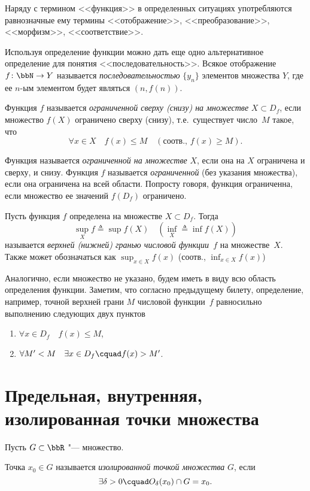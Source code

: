 Наряду с термином <<функция>> в определенных ситуациях употребляются равнозначные ему термины <<отображение>>, <<преобразование>>, <<морфизм>>, <<соответствие>>.
\begin{notion}
Используя определение функции можно дать еще одно альтернативное определение для понятия <<последовательность>>. Всякое отображение $f\colon \bbN \to Y$  называется \textit{последовательностью} $\{y_n\}$ элементов множества $Y$, где ее $n$-ым элементом будет являться $(n, f(n))$.
\end{notion} 

\begin{defn}
Функция $f$ называется \textit{ограниченной сверху (снизу) на множестве} $X\subset D_f$, если множество $f(X)$ ограничено сверху (снизу), т.е.~существует число~$M$ такое, что
$$
\forall x \in X \quad f(x) \le M \quad (\text{соотв., }f(x)\ge M).
$$
\end{defn}

Функция называется \textit{ограниченной на множестве} $X$, если она на $X$ ограничена и сверху, и снизу. Функция $f$ называется \textit{ограниченной} (без указания множества), если она ограничена на всей области. Попросту говоря, функция ограниченна, если множество ее значений $f(D_f)$ ограничено.

\begin{defn}
Пусть функция $f$ определена на множестве $X\subset D_f$. Тогда 
$$
\sup_{X}\limits f \triangleq \sup f(X)\quad (\inf_{X}\limits \triangleq \inf f(X))
$$ называется \textit{верхней (нижней) гранью числовой функции~$f$} на множестве~$X$. Также может обозначаться как $\sup_{x\in X}\limits f(x)$ (соотв., $\inf_{x\in X}\limits f(x)$)
\end{defn}

Аналогично, если множество не указано, будем иметь в виду всю область определения функции. Заметим, что согласно предыдущему билету, определение, например, точной верхней грани $M$ числовой функции~$f$ равносильно выполнению следующих двух пунктов 
\begin{enumerate}
\item
$\forall x \in D_f\quad f(x) \le M$,
\item
$\forall M' < M \quad \exists x\in D_f\cquad f(x) > M'$.
\end{enumerate}

\section{Предельная, внутренняя, изолированная точки множества}
Пусть $G \subset \bbR$ "--- множество.
\begin{defn}
Точка $x_0 \in G$ называется \textit{изолированной точкой множества} $G$, если $$\exists \delta >0\cquad  O_\delta(x_0) \cap G = x_0.$$
\end{defn}

